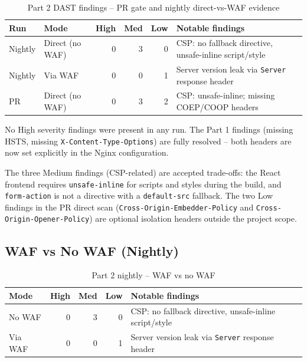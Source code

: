 \documentclass[12pt,a4paper]{report}
\begin{document}
\begin{table}[H]
\centering
\caption{Part 2 DAST findings -- PR gate and nightly direct-vs-WAF evidence}
\begin{tabularx}{\linewidth}{l l r r r X}
\toprule
\textbf{Run} & \textbf{Mode} & \textbf{High} & \textbf{Med} & \textbf{Low} & \textbf{Notable findings} \\
\midrule
Nightly & Direct (no WAF) & 0 & 3 & 0 & CSP: no fallback directive, unsafe-inline script/style \\
Nightly & Via WAF         & 0 & 0 & 1 & Server version leak via \texttt{Server} response header \\
PR      & Direct (no WAF) & 0 & 3 & 2 & CSP: unsafe-inline; missing COEP/COOP headers \\
\bottomrule
\end{tabularx}
\end{table}

No High severity findings were present in any run. The Part 1 findings (missing HSTS,
missing \texttt{X-Content-Type-Options}) are fully resolved -- both headers are now set
explicitly in the Nginx configuration.

The three Medium findings (CSP-related) are accepted trade-offs: the React frontend
requires \texttt{unsafe-inline} for scripts and styles during the build, and \texttt{form-action}
is not a directive with a \texttt{default-src} fallback. The two Low findings in the PR direct
scan (\texttt{Cross-Origin-Embedder-Policy} and \texttt{Cross-Origin-Opener-Policy}) are
optional isolation headers outside the project scope.

\subsection{WAF vs No WAF (Nightly)}

\begin{table}[H]
\centering
\caption{Part 2 nightly -- WAF vs no WAF}
\begin{tabularx}{\linewidth}{l r r r X}
\toprule
\textbf{Mode} & \textbf{High} & \textbf{Med} & \textbf{Low} & \textbf{Notable findings} \\
\midrule
No WAF  & 0 & 3 & 0 & CSP: no fallback directive, unsafe-inline script/style \\
Via WAF & 0 & 0 & 1 & Server version leak via \texttt{Server} response header \\
\bottomrule
\end{tabularx}
\end{table}
\end{document}
